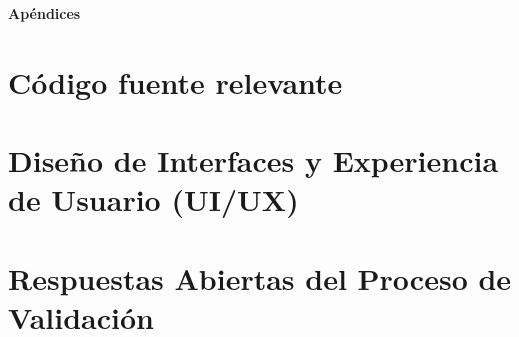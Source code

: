 \documentclass[12pt,twoside,titlepage]{report}
\begin{document}

{}

\footnotesize{
%

\nocite{*} 

}



\raggedbottom
\afterpage{\blankpage}

\newpage





\appendix

{}

\mbox{}
\vfill
\begin{center}
\begin{Huge}
\textbf{Apéndices}
\end{Huge}
\end{center}
\vfill
\mbox{}
\thispagestyle{empty}

\newpage
\mbox{}
\thispagestyle{empty}
\newpage


\chapter{Código fuente relevante}
\label{sec:apendice}


\chapter{Diseño de Interfaces y Experiencia de Usuario (UI/UX)}
\label{sec:apendice_uiux}


\chapter{Respuestas Abiertas del Proceso de Validación}
\label{sec:apendice_comentarios}


\end{document}

